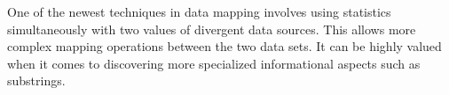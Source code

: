 \documentclass[12pt]{article}
\begin{document}
One of the newest techniques in data mapping involves using statistics simultaneously with two values of divergent data sources. This allows more complex mapping operations between the two data sets. It can be highly valued when it comes to discovering more specialized informational aspects such as substrings.
\end{document}
